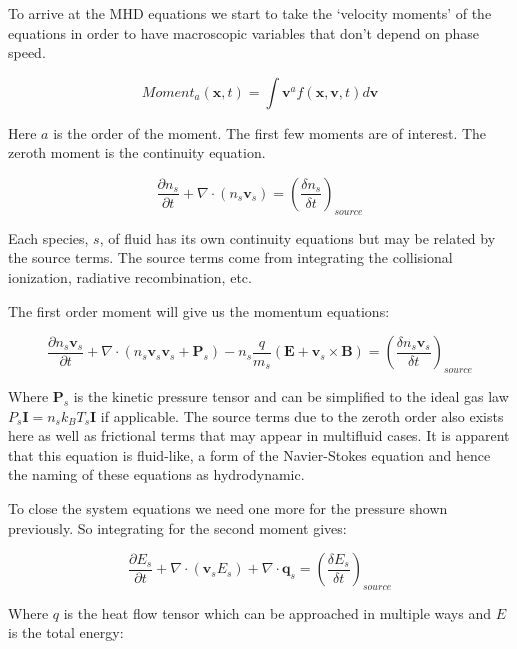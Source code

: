 \documentclass[12pt,upcase]{umlthesis}
\begin{document}
To arrive at the MHD equations we start to take the `velocity moments' of the equations in order to have macroscopic variables that don't depend on phase speed.

\begin{equation}
	{Moment}_a(\textbf{x}, t) = \int{\textbf{v}^a f(\textbf{x}, \textbf{v}, t)}d\textbf{v}
\end{equation}

Here $a$ is the order of the moment. The first few moments are of interest. The zeroth moment is the continuity equation.

\begin{equation}\label{eq:continuityequation}
	\frac{\partial n_s}{\partial t} + \nabla \cdot (n_s \textbf{v}_s) = {(\frac{\delta n_s}{\delta t})}_{source}
\end{equation}

Each species, $s$, of fluid has its own continuity equations but may be related by the source terms. The source terms come from integrating the collisional ionization, radiative recombination, etc.

The first order moment will give us the momentum equations:

\begin{equation}\label{eq:momentumequation}
	\frac{\partial n_s \textbf{v}_s}{\partial t} + \nabla \cdot (n_s \textbf{v}_s \textbf{v}_s + \textbf{P}_s ) -n_s \frac{q}{m_s}(\textbf{E} + \textbf{v}_s \times \textbf{B}) = {(\frac{\delta n_s \textbf{v}_s}{\delta t})}_{source}
\end{equation}

Where $\textbf{P}_s$ is the kinetic pressure tensor and can be simplified to the ideal gas law $P_s\textbf{I} = n_s k_B T_s \textbf{I}$ if applicable. The source terms due to the zeroth order also exists here as well as frictional terms that may appear in multifluid cases. It is apparent that this equation is fluid-like, a form of the Navier-Stokes equation and hence the naming of these equations as hydrodynamic.

To close the system equations we need one more for the pressure shown previously. So integrating for the second moment gives:

\begin{equation}\label{eq:energyequation}
	\frac{\partial E_s}{\partial t} + \nabla \cdot (\textbf{v}_s E_s) + \nabla \cdot \textbf{q}_s = {(\frac{\delta E_s}{\delta t})}_{source}
\end{equation}

Where $q$ is the heat flow tensor which can be approached in multiple ways and $E$ is the total energy:
\end{document}
